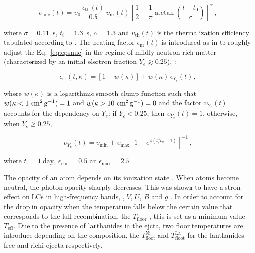 \begin{equation}
\label{eq:epsnuc}
\upsilon_{\text{nuc}}(t)= \upsilon_0 \, \frac{\epsilon_{\text{th}}(t)}{0.5} \, \upsilon_{\text{nr}}(t) \,\left[ \frac{1}{2} - \frac{1}{\pi} \arctan\left(\frac{t-t_0}{\sigma}\right)\right]^{\alpha}\,,
\end{equation}

where $\sigma = 0.11$~s, $t_0 = 1.3$~s, $\alpha=1.3$ and $\upsilon_{\text{th}}(t)$ is the thermalization
efficiency tabulated according to \citet{Barnes:2016umi}.
The heating factor $\epsilon_{\text{nr}}(t) $ is introduced as in \citet{Perego:2017wtu} to roughly adjust the Eq.~\eqref{eq:epsnuc} in the regime of mildly neutron-rich matter (characterized by an initial electron fraction $Y_e \gtrsim 0.25$), \citep[see, \eg][]{Martin:2015hxa}:

\begin{equation}
\label{eq:epsnr}
\epsilon_{\text{nr}}(t,\kappa) = \left[1-w(\kappa)\right] + w(\kappa)\,\epsilon_{Y_e}(t)\,,  
\end{equation}

where $w(\kappa)$ is a logarithmic smooth clump function such that $w(\kappa < 1~{\rm cm^{2}\,g^{-1}}) = 1$ and 
$w(\kappa > 10~{\rm cm^{2}\,g^{-1}})=0$ and the factor $\upsilon_{Y_e}(t)$ accounts for the dependency on $Y_e$:
if $Y_e < 0.25$, then $\upsilon_{Y_e}(t)=1$, otherwise, when $Y_e \ge 0.25$,

\begin{equation}
\label{eq:epsye}
\upsilon_{Y_e}(t) =\upsilon_{\text{min}}+{\upsilon_{\text{max}}}{\left[1+ e ^{4(t/t_\upsilon-1)}\right]}^{-1}\,,
\end{equation}

where $t_\epsilon = 1~{\text{day}}$, $\epsilon_{\text{min}}=0.5$ an $\epsilon_{\text{max}} = 2.5$.

The opacity of an atom depends on its ionization state . When atoms become neutral, the photon opacity sharply decreases. This was shown to have a stron effect on \acp{LC} in high-frequency bands, \eg, $V$, $U$, $B$ and $g$ \citep{Villar:2017oya}.
In order to account for the drop in opacity when the temperature falls below the certain value that corresponds to the full recombination, the $T_{\text{floor}}$ \cite{Kasen:2017sxr,Kasen:2018drm}, 
this is set as a minimum value $T_{\text{eff}}$.
Due to the presence of lanthanides in the ejcta, two floor 
temperatures are introduce depending on the composition,
the $T_{\text{floot}}^{\text{Ni}}$ and $T_{\text{floot}}^{\text{La}}$ for the lanthanides free and richi ejecta respectively.


